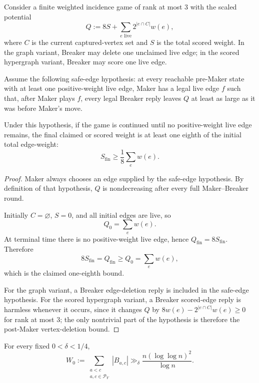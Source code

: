 \begin{proposition}\label{prop:t2-finite-capture}
Consider a finite weighted incidence game of rank at most $3$ with the scaled
potential
\[
  Q:=8S+\sum_{e\text{ live}}2^{|e\cap C|}w(e),
\]
where $C$ is the current captured-vertex set and $S$ is the total scored
weight.  In the graph variant, Breaker may delete one unclaimed live edge; in
the scored hypergraph variant, Breaker may score one live edge.

Assume the following safe-edge hypothesis: at every reachable pre-Maker state
with at least one positive-weight live edge, Maker has a legal live edge $f$
such that, after Maker plays $f$, every legal Breaker reply leaves $Q$ at least
as large as it was before Maker's move.

Under this hypothesis, if the game is continued until no positive-weight live
edge remains, the final claimed or scored weight is at least one eighth of the
initial total edge-weight:
\[
  S_{\mathrm{fin}}
  \ge
  \frac18\sum_{e}w(e).
\]
\end{proposition}

\begin{proof}
Maker always chooses an edge supplied by the safe-edge hypothesis.  By
definition of that hypothesis, $Q$ is nondecreasing after every full
Maker--Breaker round.

Initially $C=\varnothing$, $S=0$, and all initial edges are live, so
\[
  Q_0=\sum_e w(e).
\]
At terminal time there is no positive-weight live edge, hence
$Q_{\mathrm{fin}}=8S_{\mathrm{fin}}$.  Therefore
\[
  8S_{\mathrm{fin}}=Q_{\mathrm{fin}}\ge Q_0=\sum_e w(e),
\]
which is the claimed one-eighth bound.

For the graph variant, a Breaker edge-deletion reply is included in the
safe-edge hypothesis.  For the scored hypergraph variant, a Breaker scored-edge
reply is harmless whenever it occurs, since it changes $Q$ by
$8w(e)-2^{|e\cap C|}w(e)\ge0$ for rank at most $3$; the only nontrivial part of
the hypothesis is therefore the post-Maker vertex-deletion bound.
\end{proof}

\begin{proposition}\label{prop:t2-initial-mass}
For every fixed $0<\delta<1/4$,
\[
  W_0
  :=
  \sum_{\substack{a<c\\a,c\in\mathcal P_Y}} |B_{a,c}|
  \gg_\delta
  \frac{n(\log\log n)^2}{\log n}.
\]
\end{proposition}

